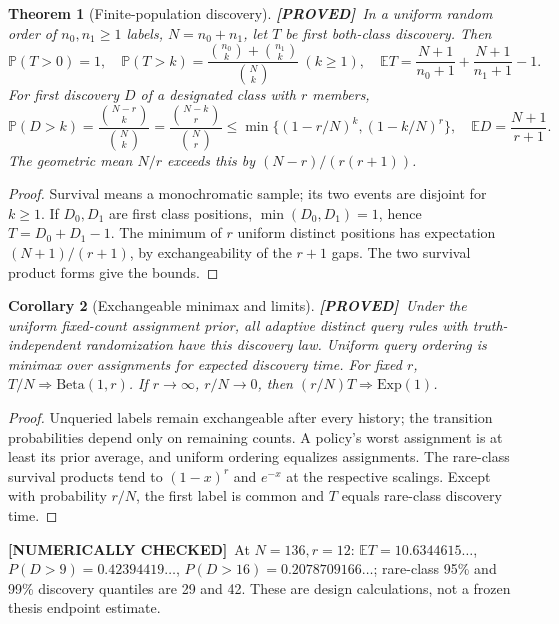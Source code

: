 \documentclass[11pt]{article}
\newtheorem{theorem}{Theorem}[section]
\newtheorem{corollary}[theorem]{Corollary}
\theoremstyle{definition}
\newcommand{\E}{\mathbb E}
\newcommand{\Pp}{\mathbb P}
\newcommand{\1}{\mathbf 1}
\newcommand{\pr}{\textbf{[PROVED]}}
\newcommand{\nc}{\textbf{[NUMERICALLY CHECKED]}}
\begin{document}
\begin{theorem}[Finite-population discovery]\label{th:discovery}
\pr\ In a uniform random order of $n_0,n_1\ge1$ labels, $N=n_0+n_1$,
let $T$ be first both-class discovery. Then
\[
 \Pp(T>0)=1,\quad
 \Pp(T>k)=\frac{\binom{n_0}k+\binom{n_1}k}{\binom Nk}\ (k\ge1),\quad
 \E T=\frac{N+1}{n_0+1}+\frac{N+1}{n_1+1}-1.
\]
For first discovery $D$ of a designated class with $r$ members,
\[
 \Pp(D>k)=\frac{\binom{N-r}k}{\binom Nk}
 =\frac{\binom{N-k}r}{\binom Nr}
 \le\min\{(1-r/N)^k,(1-k/N)^r\},\quad
 \E D=\frac{N+1}{r+1}.
\]
The geometric mean $N/r$ exceeds this by $(N-r)/(r(r+1))$.
\end{theorem}
\begin{proof}
Survival means a monochromatic sample; its two events are disjoint for
$k\ge1$. If $D_0,D_1$ are first class positions, $\min(D_0,D_1)=1$,
hence $T=D_0+D_1-1$. The minimum of $r$ uniform distinct positions has
expectation $(N+1)/(r+1)$, by exchangeability of the $r+1$ gaps.
The two survival product forms give the bounds.
\end{proof}
\begin{corollary}[Exchangeable minimax and limits]
\pr\ Under the uniform fixed-count assignment prior, all adaptive distinct
query rules with truth-independent randomization have this discovery law.
Uniform query ordering is minimax over assignments for expected discovery
time. For fixed $r$, $T/N\Rightarrow\mathrm{Beta}(1,r)$.
If $r\to\infty$, $r/N\to0$, then $(r/N)T\Rightarrow\mathrm{Exp}(1)$.
\end{corollary}
\begin{proof}
Unqueried labels remain exchangeable after every history; the transition
probabilities depend only on remaining counts. A policy's worst assignment
is at least its prior average, and uniform ordering equalizes assignments.
The rare-class survival products tend to $(1-x)^r$ and $e^{-x}$ at the
respective scalings. Except with probability $r/N$, the first label is
common and $T$ equals rare-class discovery time.
\end{proof}
\nc\ At $N=136,r=12$: $\E T=10.6344615\ldots$,
$P(D>9)=0.42394419\ldots$, $P(D>16)=0.2078709166\ldots$;
rare-class 95\% and 99\% discovery quantiles are 29 and 42.
These are design calculations, not a frozen thesis endpoint estimate.
\end{document}
